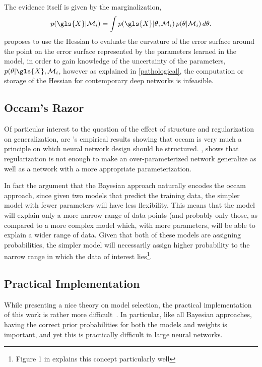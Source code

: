 \documentclass[thesis]{subfiles}
\begin{document}
The evidence itself is given by the marginalization,
\begin{equation}
	p(\gls{X}|\mathcal{M}_i) = \int p(\gls{X}|\mathbf{\theta},\mathcal{M}_i)\,p(\mathbf{\theta}|\mathcal{M}_i)\,d\mathbf{\theta}.
\end{equation}
 proposes to use the Hessian to evaluate the curvature of the error surface around the point on the error surface represented by the parameters learned in the model, in order to gain knowledge of the uncertainty of the parameters, \ie $p(\mathbf{\theta}|\gls{X},\mathcal{M}_i$, however as explained in \cref{pathological}, the computation or storage of the Hessian for contemporary deep networks is infeasible.

\subsection{Occam's Razor}
Of particular interest to the question of the effect of structure and regularization on generalization, are \citeauthor{MacKay91}'s empirical results showing that \gls{occam} is very much a principle on which neural network design should be structured. \citet[]{MacKay91}, shows that regularization is not enough to make an over-parameterized network generalize as well as a network with a more appropriate parameterization.

In fact \citeauthor{mackay1992practical} the argument that the Bayesian approach naturally encodes the \gls{occam} approach, since given two models that predict the training data, the simpler model with fewer parameters will have less flexibility. This means that the model will explain only a more narrow range of data points (and probably only those, as compared to a more complex model which, with more parameters, will be able to explain a wider range of data. Given that both of these models are assigning probabilities, the simpler model will necessarily assign higher probability to the narrow range in which the data of interest lies\footnote{Figure 1 in \citet{mackay1995} explains this concept particularly well}.

\subsection{Practical Implementation}
While presenting a nice theory on model selection, the practical implementation of this work is rather more difficult~\citep{chipman2001}. In particular, like all Bayesian approaches, having the correct prior probabilities for both the models and weights is important, and yet this is practically difficult in large neural networks.
\end{document}
